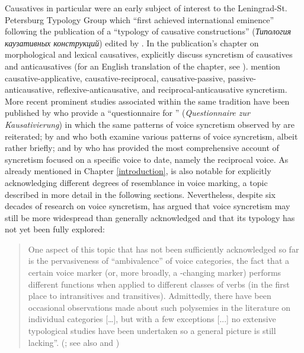 Causatives in particular were an early subject of interest to the Leningrad-St. Petersburg Typology Group which “first achieved international eminence” \citep[vii]{comrie:polinsky:1993} following the publication of a “typology of causative constructions” (\textit{Типология каузативных конструкций}) edited by \citet{xolodovic:1969}. In the publication’s chapter on morphological and lexical causatives, \citet[35ff., 40ff.]{nedjalkov:silnickij:1969} explicitly discuss syncretism of causatives and anticausatives (for an English translation of the chapter, see \citealt{nedyalkov:silnitsky:1973}). \citeauthor{nedjalkov:silnickij:1969} mention causative-applicative, causative-reciprocal, causative-passive, passive-anticausative, reflexive-anticausative, and reciprocal-anticausative syncretism. More recent prominent studies associated within the same tradition have been published by \citet{kulikov:nedjalkov:1992} who provide a “questionnaire for ” (\textit{Questionnaire zur Kausativierung}) in which the same patterns of voice syncretism observed by \citet{nedjalkov:silnickij:1969} are reiterated; by \citet{kazenin:1994, kazenin:2001a} and \citet{kulikov:2001} who both examine various patterns of voice syncretism, albeit rather briefly; and by \citet{nedjalkov:2007d} who has provided the most comprehensive account of syncretism focused on a specific voice to date, namely the reciprocal voice. As already mentioned in Chapter \ref{introduction}, \citeauthor{nedjalkov:2007d} is also notable for explicitly acknowledging different degrees of resemblance in voice marking, a topic described in more detail in the following sections. Nevertheless, despite six decades of research on voice syncretism, \citet{malchukov:2015, malchukov:2016, malchukov:2017} has argued that voice syncretism may still be more widespread than generally acknowledged and that its typology has not yet been fully explored:

\begin{quote}
	One aspect of this topic that has not been sufficiently acknowledged so far is the pervasiveness of “ambivalence” of voice categories, the fact that a certain voice marker (or, more broadly, a -changing marker) performs different functions when applied to different  classes of verbs (in the first place to intransitives and transitives). Admittedly, there have been occasional observations made about such polysemies in the literature on individual  categories […], but with a few exceptions [...] no extensive typological studies have been undertaken so a general picture is still lacking”. (\citealt[259]{malchukov:2016}; see also \citeyear[103]{malchukov:2015} and \citeyear[3]{malchukov:2017})
\end{quote} 



